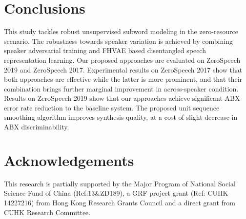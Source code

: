 \documentclass[a4paper]{article}
\begin{document}
\section{Conclusions}
This study tackles robust unsupervised subword modeling in the zero-resource scenario. The robustness  towards speaker variation is achieved by combining speaker adversarial training and FHVAE based disentangled speech representation learning. 
Our proposed approaches are evaluated on  ZeroSpeech 2019 and ZeroSpeech 2017. Experimental results on ZeroSpeech 2017 
show that both approaches are effective  while the latter is more prominent, and that their combination brings further marginal improvement in across-speaker condition.
Results on ZeroSpeech 2019 show that our approaches achieve significant  ABX error rate reduction  to the baseline system. 
The proposed unit sequence smoothing algorithm improves synthesis quality, at a cost of slight decrease in ABX discriminability.

\section{Acknowledgements}

This research is partially supported by the Major Program of National Social Science Fund of  China (Ref:13\&ZD189),
a GRF project grant (Ref: CUHK 14227216) from Hong Kong Research Grants Council  and a direct grant from CUHK Research Committee.



\end{document}
